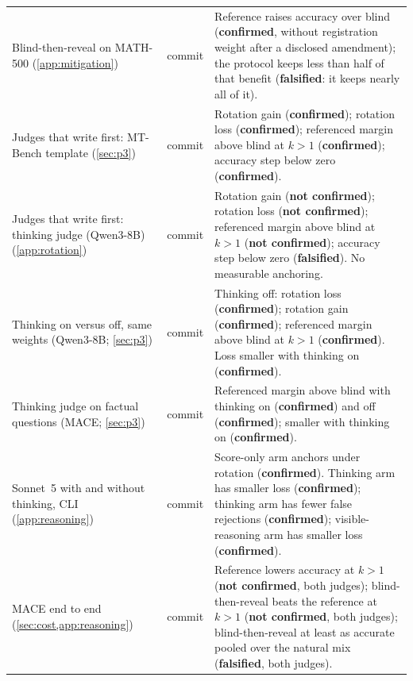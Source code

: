 {\begin{longtable}{L{3.2cm}L{1.1cm}L{8.7cm}}
Blind-then-reveal on MATH-500 (\cref{app:mitigation}) & commit & Reference raises accuracy over blind (\textbf{confirmed}, without registration weight after a disclosed amendment); the protocol keeps less than half of that benefit (\textbf{falsified}: it keeps nearly all of it). \\
Judges that write first: MT-Bench template (\cref{sec:p3}) & commit & Rotation gain (\textbf{confirmed}); rotation loss (\textbf{confirmed}); referenced margin above blind at $k{>}1$ (\textbf{confirmed}); accuracy step below zero (\textbf{confirmed}). \\
Judges that write first: thinking judge (Qwen3-8B) (\cref{app:rotation}) & commit & Rotation gain (\textbf{not confirmed}); rotation loss (\textbf{not confirmed}); referenced margin above blind at $k{>}1$ (\textbf{not confirmed}); accuracy step below zero (\textbf{falsified}). No measurable anchoring. \\
Thinking on versus off, same weights (Qwen3-8B; \cref{sec:p3}) & commit & Thinking off: rotation loss (\textbf{confirmed}); rotation gain (\textbf{confirmed}); referenced margin above blind at $k{>}1$ (\textbf{confirmed}). Loss smaller with thinking on (\textbf{confirmed}). \\
Thinking judge on factual questions (\textsc{MACE}; \cref{sec:p3}) & commit & Referenced margin above blind with thinking on (\textbf{confirmed}) and off (\textbf{confirmed}); smaller with thinking on (\textbf{confirmed}). \\
Sonnet~5 with and without thinking, CLI (\cref{app:reasoning}) & commit & Score-only arm anchors under rotation (\textbf{confirmed}). Thinking arm has smaller loss (\textbf{confirmed}); thinking arm has fewer false rejections (\textbf{confirmed}); visible-reasoning arm has smaller loss (\textbf{confirmed}). \\
\textsc{MACE} end to end (\cref{sec:cost,app:reasoning}) & commit & Reference lowers accuracy at $k{>}1$ (\textbf{not confirmed}, both judges); blind-then-reveal beats the reference at $k{>}1$ (\textbf{not confirmed}, both judges); blind-then-reveal at least as accurate pooled over the natural mix (\textbf{falsified}, both judges). \\

\end{longtable}}
